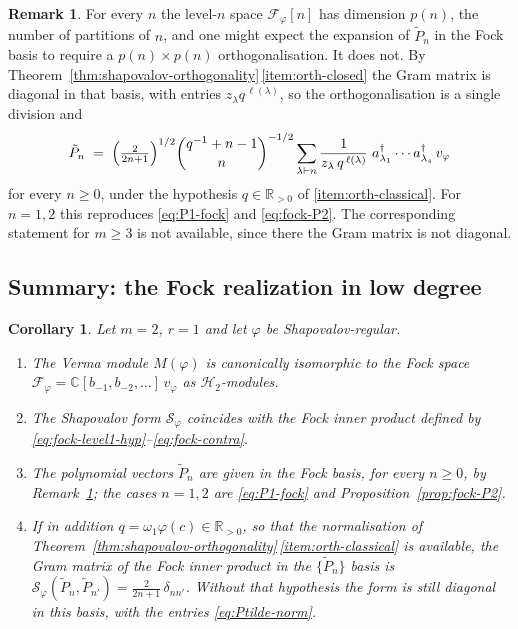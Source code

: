 \documentclass[12pt]{amsart}
\theoremstyle{plain}
\newtheorem{corollary}[theorem]{Corollary}
\theoremstyle{definition}
\newtheorem{remark}[theorem]{Remark}
\newcommand{\CC}{\mathbb{C}}
\newcommand{\RR}{\mathbb{R}}
\newcommand{\Mf}{M(\varphi)}          %
\newcommand{\Sf}{\mathcal{S}_\varphi} %
\newcommand{\vf}{v_\varphi}           %
\begin{document}
\begin{remark}
\label{rem:fock-obstacle}
For every $n$ the level-$n$ space $\mathcal{F}_\varphi[n]$ has dimension
$p(n)$, the number of partitions of $n$, and one might expect the
expansion of $\tilde{P}_n$ in the Fock basis to require a
$p(n)\times p(n)$ orthogonalisation. It does not. By
Theorem~\ref{thm:shapovalov-orthogonality}\,\ref{item:orth-closed} the
Gram matrix is diagonal in that basis, with entries
$z_\lambda q^{\,\ell(\lambda)}$, so the orthogonalisation is a single
division and
\[
  \tilde{P}_n
  \;=\;
  \Bigl(\tfrac{2}{2n+1}\Bigr)^{1/2}
  \binom{q^{-1}+n-1}{n}^{-1/2}
  \sum_{\lambda \vdash n} \frac{1}{z_\lambda\,q^{\,\ell(\lambda)}}\;
  a^{\dagger}_{\lambda_1}\cdots a^{\dagger}_{\lambda_s}\,\vf
\]
for every $n \geq 0$, under the hypothesis $q \in \RR_{>0}$ of
\ref{item:orth-classical}. For $n = 1, 2$ this reproduces
\eqref{eq:P1-fock} and \eqref{eq:fock-P2}. The corresponding statement
for $m \geq 3$ is not available, since there the Gram matrix is not
diagonal.
\end{remark}

\subsection{Summary: the Fock realization in low degree}
\label{subsec:fock-summary}

\begin{corollary}
\label{cor:fock-s3}
Let $m = 2$, $r = 1$ and let $\varphi$ be Shapovalov-regular.
\begin{enumerate}[label=\textup{(\roman*)}]
  \item The Verma module $\Mf$ is canonically isomorphic to the
        Fock space $\mathcal{F}_\varphi = \CC[b_{-1},b_{-2},\ldots]\,\vf$
        as $\mathcal{H}_2$-modules.
  \item The Shapovalov form $\Sf$ coincides with the Fock inner product
        defined by \eqref{eq:fock-level1-hyp}--\eqref{eq:fock-contra}.
  \item The polynomial vectors $\tilde{P}_n$ are given in the Fock basis,
        for every $n \geq 0$, by Remark~\ref{rem:fock-obstacle}; the cases
        $n = 1, 2$ are \eqref{eq:P1-fock} and Proposition~\ref{prop:fock-P2}.
  \item If in addition $q = \omega_1\varphi(c) \in \RR_{>0}$, so that the
        normalisation of
        Theorem~\ref{thm:shapovalov-orthogonality}\,\ref{item:orth-classical}
        is available, the Gram matrix of the Fock inner product in the
        $\{\tilde{P}_n\}$ basis is
        $\Sf(\tilde{P}_n,\tilde{P}_{n'}) = \tfrac{2}{2n+1}\,\delta_{n n'}$.
        Without that hypothesis the form is still diagonal in this basis,
        with the entries \eqref{eq:Ptilde-norm}.
\end{enumerate}
\end{corollary}
\end{document}
